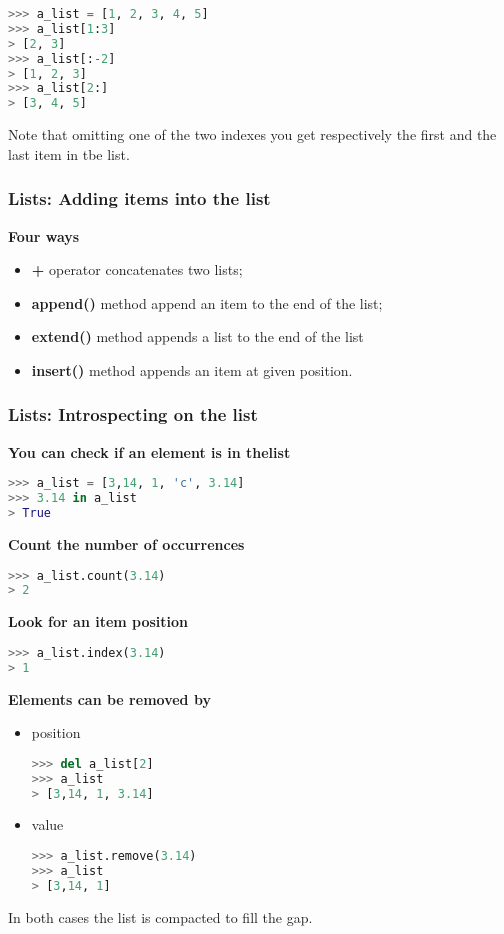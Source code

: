\begin{lstlisting}[language=Python]
>>> a_list = [1, 2, 3, 4, 5]
>>> a_list[1:3]
> [2, 3]
>>> a_list[:-2]
> [1, 2, 3]
>>> a_list[2:]
> [3, 4, 5]
\end{lstlisting}

Note that omitting one of the two indexes you get respectively the first and the last item in tbe list.

\subsubsection{Lists: Adding items into the list}
\textbf{Four ways}
\begin{itemize}
	\item \textbf{+} operator concatenates two lists;
	\item \textbf{append()} method append an item to the end of the list;
	\item \textbf{extend()} method appends a list to the end of the list
	\item \textbf{insert()} method appends an item at given position.
\end{itemize}

\subsubsection{Lists: Introspecting on the list}
\textbf{You can check if an element is in thelist}
\begin{lstlisting}[language=Python]
>>> a_list = [3,14, 1, 'c', 3.14]
>>> 3.14 in a_list
> True
\end{lstlisting}
\textbf{Count the number of occurrences}
\begin{lstlisting}[language=Python]
>>> a_list.count(3.14)
> 2
\end{lstlisting}
\textbf{Look for an item position}
\begin{lstlisting}[language=Python]
>>> a_list.index(3.14)
> 1
\end{lstlisting}
\textbf{Elements can be removed by}
\begin{itemize}
	\item position
\begin{lstlisting}[language=Python]
>>> del a_list[2]
>>> a_list
> [3,14, 1, 3.14]
\end{lstlisting}
	\item value
\begin{lstlisting}[language=Python]
>>> a_list.remove(3.14)
>>> a_list
> [3,14, 1]
\end{lstlisting}
\end{itemize}
In both cases the list is compacted to fill the gap.

